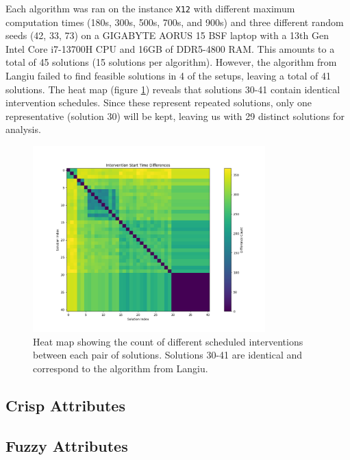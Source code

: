 Each algorithm was ran on the instance \texttt{X12} with different maximum computation times (180s, 300s, 500s, 700s, and 900s) and three different random seeds (42, 33, 73) on a GIGABYTE AORUS 15 BSF laptop with a 13th Gen Intel Core i7-13700H CPU and 16GB of DDR5-4800 RAM. This amounts to a total of 45 solutions (15 solutions per algorithm). However, the algorithm from Langiu failed to find feasible solutions in 4 of the setups, leaving a total of 41 solutions. The heat map (figure \ref{fig:dif_sol}) reveals that solutions 30-41 contain identical intervention schedules. Since these represent repeated solutions, only one representative (solution 30) will be kept, leaving us with 29 distinct solutions for analysis.

\begin{figure}[ht]
    \centering
    \includegraphics[width=0.8\textwidth]{ch3/figures/diff_sol.png}
    \caption{Heat map showing the count of different scheduled interventions between each pair of solutions. Solutions 30-41 are identical and correspond to the algorithm from Langiu.}
    \label{fig:dif_sol}
\end{figure}









\subsection{Crisp Attributes}


\subsection{Fuzzy Attributes}

 

